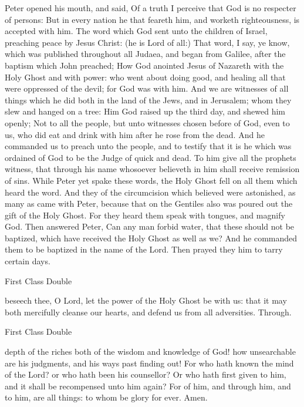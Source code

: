  Peter opened his mouth, and said, Of a truth I perceive that God is no respecter of persons: But in every nation he that feareth him, and worketh righteousness, is accepted with him. The word which God sent unto the children of Israel, preaching peace by Jesus Christ: (he is Lord of all:) That word, I say, ye know, which was published throughout all Judaea, and began from Galilee, after the baptism which John preached; How God anointed Jesus of Nazareth with the Holy Ghost and with power: who went about doing good, and healing all that were oppressed of the devil; for God was with him. And we are witnesses of all things which he did both in the land of the Jews, and in Jerusalem; whom they slew and hanged on a tree: Him God raised up the third day, and shewed him openly; Not to all the people, but unto witnesses chosen before of God, even to us, who did eat and drink with him after he rose from the dead.
%
And he commanded us to preach unto the people, and to testify that it is he which was ordained of God to be the Judge of quick and dead. To him give all the prophets witness, that through his name whosoever believeth in him shall receive remission of sins. While Peter yet spake these words, the Holy Ghost fell on all them which heard the word. And they of the circumcision which believed were astonished, as many as came with Peter, because that on the Gentiles also was poured out the gift of the Holy Ghost. For they heard them speak with tongues, and magnify God. Then answered Peter, Can any man forbid water, that these should not be baptized, which have received the Holy Ghost as well as we? And he commanded them to be baptized in the name of the Lord. Then prayed they him to tarry certain days.

\begin{inhead}
    {First Class Double}
\end{inhead}


\collect
{} beseech thee, O Lord, let the power of the Holy Ghost be with us: that it may both mercifully cleanse our hearts, and defend us from all adversities. Through.


\begin{inhead}
    {First Class Double}
\end{inhead}
 depth of the riches both of the wisdom and knowledge of God! how unsearchable are his judgments, and his ways past finding out! For who hath known the mind of the Lord? or who hath been his counsellor? Or who hath first given to him, and it shall be recompensed unto him again? For of him, and through him, and to him, are all things: to whom be glory for ever. Amen.


